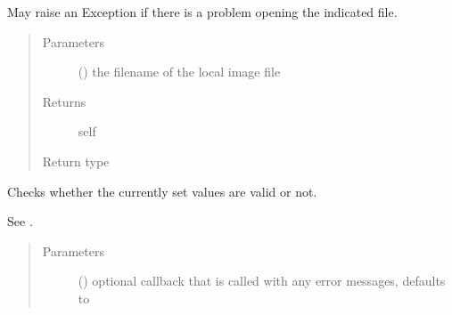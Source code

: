 \documentclass[letterpaper,10pt,english]{sphinxmanual}
\begin{document}
\begin{fulllineitems}
\begin{fulllineitems}
\sphinxAtStartPar
May raise an Exception if there is a problem opening the indicated file.
\begin{quote}\begin{description}
\item[{Parameters}] \leavevmode
\sphinxAtStartPar
{} () \textendash{} the filename of the local image file

\item[{Returns}] \leavevmode
\sphinxAtStartPar
self

\item[{Return type}] \leavevmode
\sphinxAtStartPar
{\hyperref[\detokenize{autoapi/pine/client/models/index:pine.client.models.CollectionBuilder}]{}}

\end{description}\end{quote}

\end{fulllineitems}


\begin{fulllineitems}
\label{\detokenize{autoapi/pine/client/models/index:pine.client.models.CollectionBuilder.is_valid}}
\sphinxAtStartPar
Checks whether the currently set values are valid or not.

\sphinxAtStartPar
See {\hyperref[\detokenize{autoapi/pine/client/models/index:pine.client.models.is_valid_collection}]{}}.
\begin{quote}\begin{description}
\item[{Parameters}] \leavevmode
\sphinxAtStartPar
{} (\sphinxstyleliteralemphasis{\sphinxupquote{, }}) \textendash{} optional callback that is called with any error messages, defaults to 


\end{description}
\end{quote}
\end{fulllineitems}
\end{fulllineitems}
\end{document}
